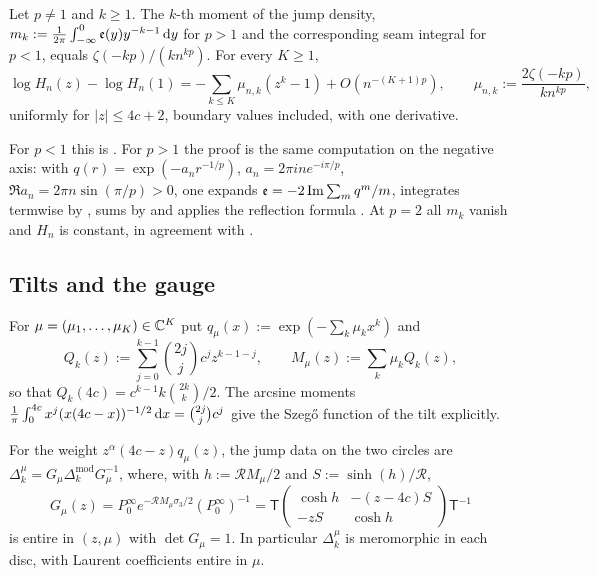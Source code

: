 \begin{lemma}\label{lem:Fprime}
Let $p\ne1$ and $k\ge1$. The $k$-th moment of the jump density, $m_k:=\frac1{2\pi}\int_{-\infty}^0\mathfrak e(y)y^{-k-1}\,\mathrm{d} y$
for $p>1$ and the corresponding seam integral for $p<1$, equals $\zeta(-kp)/(kn^{kp})$. For every $K\ge1$,
\[
  \log H_n(z)-\log H_n(1)=-\sum_{k\le K}\mu_{n,k}(z^k-1)+O(n^{-(K+1)p}),\qquad\mu_{n,k}:=\frac{2\zeta(-kp)}{kn^{kp}},
\]
uniformly for $|z|\le4c+2$, boundary values included, with one derivative.
\end{lemma}

For $p<1$ this is \cite[Lemma~10.1(iii)--(iv)]{PaperII}. For $p>1$ the proof is the same computation on the negative
axis: with $q(r)=\exp(-a_nr^{-1/p})$, $a_n=2\pi ine^{-i\pi/p}$, $\Re a_n=2\pi n\sin(\pi/p)>0$, one expands
$\mathfrak e=-2\operatorname{Im}\sum_mq^m/m$, integrates termwise by \cite[(5.9.1)]{DLMF}, sums by \cite[(25.2.1)]{DLMF} and applies the
reflection formula \cite[(25.4.1)]{DLMF}. At $p=2$ all $m_k$ vanish and $H_n$ is constant, in agreement with
\cite[Lemma~8.1]{PaperII}.

\subsection{Tilts and the gauge}\label{sec:gauge}
For $\mu=(\mu_1,\dots,\mu_K)\in\mathbb{C}^K$ put $q_\mu(x):=\exp(-\sum_k\mu_kx^k)$ and
\begin{equation}\label{eq:Qk}
  Q_k(z):=\sum_{j=0}^{k-1}\binom{2j}{j}c^jz^{k-1-j},\qquad M_\mu(z):=\sum_k\mu_kQ_k(z),
\end{equation}
so that $Q_k(4c)=c^{k-1}k\binom{2k}{k}/2$. The arcsine moments $\frac1\pi\int_0^{4c}x^j(x(4c-x))^{-1/2}\,\mathrm{d} x=\binom{2j}{j}c^j$
give the Szeg\H{o} function of the tilt explicitly.

\begin{lemma}[gauge]\label{lem:gauge}
For the weight $z^\alpha(4c-z)q_\mu(z)$, the jump data on the two circles are $\Delta_k^\mu=G_\mu\Delta_k^{\mathrm{mod}}G_\mu^{-1}$,
where, with $h:=\mathcal RM_\mu/2$ and $S:=\sinh(h)/\mathcal R$,
\[
  G_\mu(z)=P_0^\infty e^{-\mathcal R M_\mu\sigma_3/2}(P_0^\infty)^{-1}
  =\mathsf T\begin{pmatrix}\cosh h&-(z-4c)S\\-zS&\cosh h\end{pmatrix}\mathsf T^{-1}
\]
is entire in $(z,\mu)$ with $\det G_\mu=1$. In particular $\Delta_k^\mu$ is meromorphic in each disc, with Laurent
coefficients entire in $\mu$.
\end{lemma}

